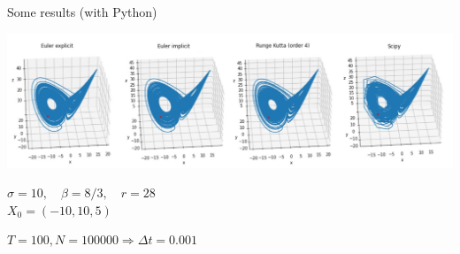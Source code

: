 \documentclass[10pt,xcolor={table,dvipsnames},t]{beamer}
\begin{document}
	\begin{frame}{Some results (with Python)}
		
		\includegraphics[width=\textwidth]{images/N100000.png} \\ 
		\begin{center}
			\begin{minipage}[c]{0.5\linewidth}
				$\sigma=10,\quad \beta=8/3, \quad r=28$ \\
				$X_0=(-10,10,5)$ 
			\end{minipage}
			$T=100, N = 100000 \Rightarrow \Delta t=0.001$
		\end{center}
		
	\end{frame}
	
\end{document}
